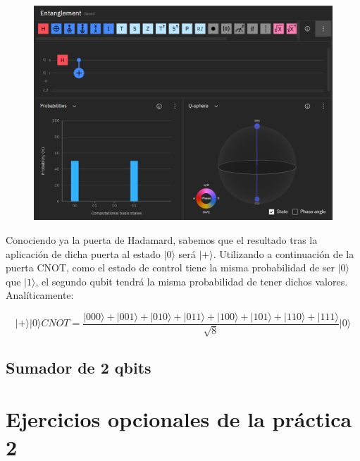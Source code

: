 \documentclass[11pt]{article}
\newcommand{\ra}{\rangle}
\newcommand{\ra}{\rangle}
\begin{document}
\begin{figure}[H]
	\centering
	\includegraphics[scale=0.8]{figures/entanglement.png}
\end{figure}

Conociendo ya la puerta de Hadamard, sabemos que el resultado tras la aplicación de dicha puerta al estado $|0\ra$ será $|+\ra$. Utilizando a continuación de la puerta CNOT, como el estado de control tiene la misma probabilidad de ser $|0\ra$ que $|1\ra$, el segundo qubit tendrá la misma probabilidad de tener dichos valores. Analíticamente:

\[
	|+\ra|0\ra CNOT = \frac{|000\ra + |001\ra + |010\ra + |011\ra + |100\ra + |101\ra + |110\ra + |111\ra}{\sqrt 8} |0\ra
\]

\Phi



\subsection{Sumador de 2 qbits}



\section{Ejercicios opcionales de la práctica 2}
\end{document}
